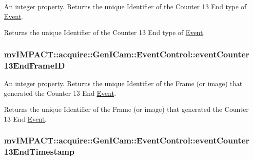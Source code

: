 An integer property. Returns the unique Identifier of the Counter 13 End type of \hyperlink{classmv_i_m_p_a_c_t_1_1acquire_1_1_event}{Event}. 

Returns the unique Identifier of the Counter 13 End type of \hyperlink{classmv_i_m_p_a_c_t_1_1acquire_1_1_event}{Event}. \hypertarget{classmv_i_m_p_a_c_t_1_1acquire_1_1_gen_i_cam_1_1_event_control_abc5a960c7b5993b2dcd8740cce93bf6f}{
\subsubsection[{event\+Counter13\+End\+Frame\+I\+D}]{ mv\+I\+M\+P\+A\+C\+T\+::acquire\+::\+Gen\+I\+Cam\+::\+Event\+Control\+::event\+Counter13\+End\+Frame\+I\+D}}\label{classmv_i_m_p_a_c_t_1_1acquire_1_1_gen_i_cam_1_1_event_control_abc5a960c7b5993b2dcd8740cce93bf6f}


An integer property. Returns the unique Identifier of the Frame (or image) that generated the Counter 13 End \hyperlink{classmv_i_m_p_a_c_t_1_1acquire_1_1_event}{Event}. 

Returns the unique Identifier of the Frame (or image) that generated the Counter 13 End \hyperlink{classmv_i_m_p_a_c_t_1_1acquire_1_1_event}{Event}. \hypertarget{classmv_i_m_p_a_c_t_1_1acquire_1_1_gen_i_cam_1_1_event_control_ae6d4ef51144663c001ae3a8ab83f0850}{
\subsubsection[{event\+Counter13\+End\+Timestamp}]{ mv\+I\+M\+P\+A\+C\+T\+::acquire\+::\+Gen\+I\+Cam\+::\+Event\+Control\+::event\+Counter13\+End\+Timestamp}}\label{classmv_i_m_p_a_c_t_1_1acquire_1_1_gen_i_cam_1_1_event_control_ae6d4ef51144663c001ae3a8ab83f0850}


